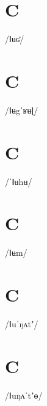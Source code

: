 \documentclass[10pt,a4paper,twoside]{book}
\begin{document}
\section*{C}

\begin{multicols}{3}
 {/ǁʉʛ/} {}
\end{multicols}

\section*{C}

\begin{multicols}{3}
 {/ǁʉgˈʁʉɭ/} {}
\end{multicols}

\section*{C}

\begin{multicols}{3}
 {/ˈǁʉhʉ/} {}
\end{multicols}

\section*{C}

\begin{multicols}{3}
 {/ǁʉm/} {}
\end{multicols}

\section*{C}

\begin{multicols}{3}
 {/ǁuˈŋʌtʼ/} {}
\end{multicols}

\section*{C}

\begin{multicols}{3}
 {/ǁuŋʌˈtʼɵ/} {}
\end{multicols}
\end{document}
